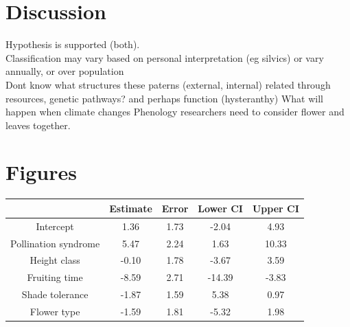 \documentclass{article}\usepackage[]{graphicx}\usepackage[]{color}
\begin{document}
\section{Discussion}
Hypothesis is supported (both).\\
Classification may vary based on personal interpretation (eg silvics) or vary annually, or over population\\
Dont know what structures these paterns (external, internal)
related through resources, genetic pathways? and perhaps function (hysteranthy)
What will happen when climate changes
Phenology researchers need to consider flower and leaves together.

\section{Figures}

\begin{table}[H]
\begin{tabular}{|c|c|c|c|c|}
\hline
 &Estimate&Error&Lower CI& Upper CI\\
 \hline
Intercept&1.36&1.73&-2.04&4.93\\
\hline
Pollination syndrome&5.47&2.24&1.63&10.33\\
\hline
Height class&-0.10&1.78&-3.67&3.59\\
\hline
Fruiting time&-8.59&2.71&-14.39&-3.83\\
\hline
Shade tolerance&-1.87&1.59&5.38&0.97\\
\hline
Flower type&-1.59&1.81&-5.32&1.98\\
\hline

\end{tabular}
\end{table}
\end{document}
